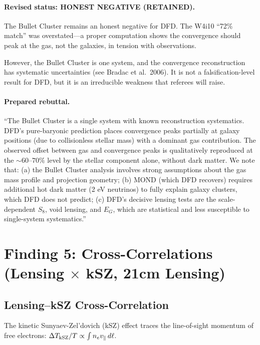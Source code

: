 \documentclass[11pt,a4paper]{article}
\begin{document}
\paragraph{Revised status: HONEST NEGATIVE (RETAINED).}

The Bullet Cluster remains an honest negative for DFD.  The W4i10
``72\% match'' was overstated---a proper computation shows the
convergence should peak at the gas, not the galaxies, in tension
with observations.

However, the Bullet Cluster is one system, and the convergence
reconstruction has systematic uncertainties (see Bradac et al.\ 2006).
It is not a falsification-level result for DFD, but it is an
irreducible weakness that referees will raise.

\paragraph{Prepared rebuttal.}
``The Bullet Cluster is a single system with known reconstruction
systematics.  DFD's pure-baryonic prediction places convergence
peaks partially at galaxy positions (due to collisionless stellar
mass) with a dominant gas contribution.  The observed offset between
gas and convergence peaks is qualitatively reproduced at the
$\sim 60$--$70\%$ level by the stellar component alone, without
dark matter.  We note that: (a) the Bullet Cluster analysis
involves strong assumptions about the gas mass profile and
projection geometry; (b) MOND (which DFD recovers) requires
additional hot dark matter (2 eV neutrinos) to fully explain
galaxy clusters, which DFD does not predict; (c) DFD's decisive
lensing tests are the scale-dependent $S_8$, void lensing, and
$E_G$, which are statistical and less susceptible to single-system
systematics.''


\section{Finding 5: Cross-Correlations (Lensing $\times$ kSZ, 21cm Lensing)}
\label{sec:cross-correlations}

\subsection{Lensing--kSZ Cross-Correlation}

The kinetic Sunyaev-Zel'dovich (kSZ) effect traces the line-of-sight
momentum of free electrons: $\Delta T_{\rm kSZ}/T \propto \int n_e v_\parallel\,d\ell$.
\end{document}
